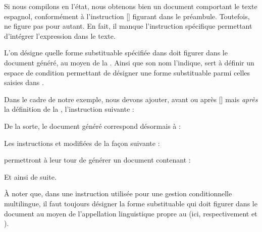 \documentclass{article}
\begin{document}
Si nous compilons en l'état, nous obtenons bien un document comportant le texte espagnol, conformément à l'instruction [] figurant dans le préambule. Toutefois,  ne figure pas pour autant. En fait, il manque l'instruction spécifique permettant d'intégrer l'expression dans le texte.

L'on désigne quelle forme substituable spécifiée dans  doit figurer dans le document généré, au moyen de la . Ainsi que son nom l'indique,  sert à définir un espace de condition permettant de désigner une forme substituable parmi celles saisies dans .

Dans le cadre de notre exemple, nous devons ajouter, avant ou après [] mais \emph{après} la définition de la , l'instruction suivante :

\begin{codeblock}
\end{codeblock}

De la sorte, le document généré correspond désormais à :

\begin{ltext}
\end{ltext}

Les instructions  et  modifiées de la façon suivante :

\begin{codeblock}
\end{codeblock}

permettront à leur tour de générer un document contenant :

\begin{ltext}
\end{ltext}

\resumepar Et ainsi de suite.

À noter que, dans une instruction  utilisée pour une gestion conditionnelle multilingue, il faut toujours désigner la forme substituable qui doit figurer dans le document au moyen de l'appellation linguistique propre au  (ici, respectivement  et ).
\end{document}
